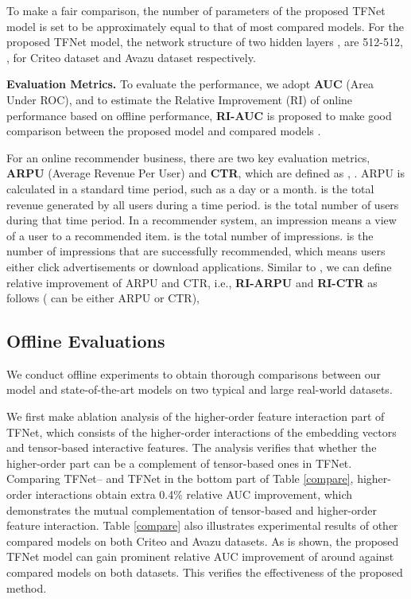 \documentclass[sigconf]{acmart}
\begin{document}
To make a fair comparison, the number of parameters of the proposed TFNet model is set to be approximately equal to that of most compared models. For the proposed TFNet model, the network structure of two hidden layers , are 512-512, ,  for Criteo dataset and Avazu dataset respectively. 

\textbf{Evaluation Metrics.} 
To evaluate the performance, we adopt \textbf{AUC} (Area Under ROC), and to estimate the Relative Improvement (RI) of online performance based on offline performance, \textbf{RI-AUC} is proposed to make good comparison between the proposed model and compared models \cite{chan2018convolutional}. 


For an online recommender business, there are two key evaluation metrics, \textbf{ARPU} (Average Revenue Per User) and \textbf{CTR}, which are defined as , . ARPU is calculated in a standard time period, such as a day or a month.  is the total revenue generated by all users during a time period.  is the total number of users during that time period. In a recommender system, an impression means a view of a user to a recommended item.  is the total number of impressions.  is the number of impressions that are successfully recommended, which means users either click advertisements or download applications. Similar to \cite{qu2018product}, we can define relative improvement of ARPU and CTR, i.e., \textbf{RI-ARPU} and \textbf{RI-CTR} as follows ( can be either ARPU or CTR),



\subsection{Offline Evaluations}
We conduct offline experiments to obtain thorough comparisons between our model and state-of-the-art models on two typical and large real-world datasets.\\


\noindent We first make ablation analysis of the higher-order feature interaction part of TFNet, which consists of the higher-order interactions of the embedding vectors and tensor-based interactive features. The analysis verifies that whether the higher-order part can be a complement of tensor-based ones in TFNet. Comparing TFNet-- and TFNet in the bottom part of Table \ref{compare}, higher-order interactions obtain extra 0.4\% relative AUC improvement, which demonstrates the mutual complementation of tensor-based and higher-order feature interaction. 
Table \ref{compare} also illustrates experimental results of other compared models on both Criteo and Avazu datasets. As is shown, the proposed TFNet model can gain prominent relative AUC improvement of around  against compared models on both datasets. This verifies the effectiveness of the proposed method.
\end{document}
